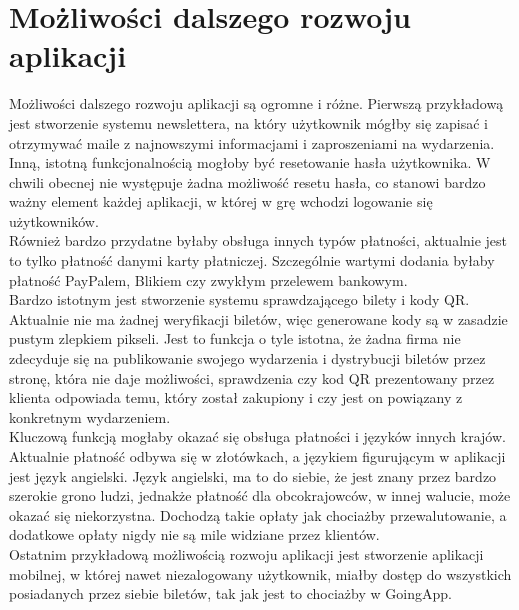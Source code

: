 \documentclass[12pt]{article}
\begin{document}
\begin{sloppypar}
\section{Możliwości dalszego rozwoju aplikacji}
{
  Możliwości dalszego rozwoju aplikacji są ogromne i różne. 
  Pierwszą przykładową jest stworzenie systemu newslettera, na który użytkownik mógłby się zapisać i otrzymywać maile z najnowszymi informacjami i zaproszeniami na wydarzenia.\\ 
  Inną, istotną funkcjonalnością mogłoby być resetowanie hasła użytkownika. W chwili obecnej nie występuje żadna możliwość resetu hasła, co stanowi bardzo ważny element 
  każdej aplikacji, w której w grę wchodzi logowanie się użytkowników.\\
  Również bardzo przydatne byłaby obsługa innych typów płatności, aktualnie jest to tylko płatność danymi karty płatniczej. 
  Szczególnie wartymi dodania byłaby płatność PayPalem, Blikiem czy zwykłym przelewem bankowym.\\
  Bardzo istotnym jest stworzenie systemu sprawdzającego bilety i kody QR. 
  Aktualnie nie ma żadnej weryfikacji biletów, więc generowane kody są w zasadzie pustym zlepkiem pikseli. 
  Jest to funkcja o tyle istotna, że żadna firma nie zdecyduje się na publikowanie swojego wydarzenia i dystrybucji biletów przez stronę, która nie daje możliwości, 
  sprawdzenia czy kod QR prezentowany przez klienta odpowiada temu, który został zakupiony i czy jest on powiązany z konkretnym wydarzeniem.\\
  Kluczową funkcją mogłaby okazać się obsługa płatności i języków innych krajów. 
  Aktualnie płatność odbywa się w złotówkach, a językiem figurującym w aplikacji jest język angielski. 
  Język angielski, ma to do siebie, że jest znany przez bardzo szerokie grono ludzi, jednakże płatność dla obcokrajowców, w innej walucie, może okazać się niekorzystna.
  Dochodzą takie opłaty jak chociażby przewalutowanie, a dodatkowe opłaty nigdy nie są mile widziane przez klientów.\\
  Ostatnim przykładową możliwością rozwoju aplikacji jest stworzenie aplikacji mobilnej, w której nawet niezalogowany użytkownik, 
  miałby dostęp do wszystkich posiadanych przez siebie biletów, tak jak jest to chociażby w GoingApp.
}

\clearpage
\printbibliography[
  heading=bibintoc, 
  title={Bibliografia}
]

\clearpage
\listoffigures

\clearpage
\listoftables

\clearpage
{}
\lstlistoflistings

\end{sloppypar}
\end{document}
